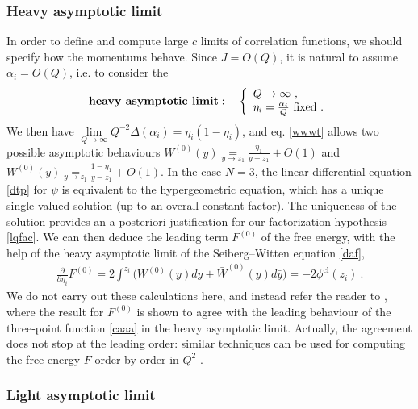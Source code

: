 \documentclass[12pt, a4paper, notitlepage, twoside]{report}
\numberwithin{equation}{section}
\theoremstyle{break}
\begin{document}
\subsubsection{Heavy asymptotic limit}

In order to define and compute large $c$ limits of correlation functions, we should specify how the momentums behave.
Since $J=O(Q)$, it is natural to assume $\alpha_i=O(Q)$, i.e. to consider the 
\begin{align}
 \textbf{\boldmath heavy\ asymptotic\ limit}\index{heavy\ asymptotic\ limit}: \quad \left\{\begin{array}{l}  Q \to \infty \ ,\\ \eta_i=\frac{\alpha_i}{Q}\ \text{fixed}\ .\end{array}\right.  
\end{align}
We then have $\underset{Q\to\infty}{\lim} Q^{-2}\Delta(\alpha_i)=\eta_i(1-\eta_i)$, and eq. \eqref{wwwt} allows two possible asymptotic behaviours $W^{(0)}(y)\underset{y\to z_1}{=} \frac{\eta_1}{y-z_1} + O(1)$ and 
$W^{(0)}(y)\underset{y\to z_1}{=} \frac{1-\eta_1}{y-z_1} + O(1)$.
In the case $N=3$, the linear differential equation \eqref{dtp} for $\psi$ is equivalent to the hypergeometric equation, which has a unique single-valued solution (up to an overall constant factor).
The uniqueness of the solution provides an a posteriori justification for our factorization hypothesis \eqref{lqfac}.
We can then deduce the leading term $F^{(0)}$ of the free energy, with the help of the heavy asymptotic limit of the Seiberg--Witten equation \eqref{daf}, 
\begin{align}
 {\frac{\partial}{\partial \eta_i}} F^{(0)} = 2\int^{z_i}\Big( W^{(0)}(y)dy + \bar W^{(0)}(y)d\bar y\Big) = -2\phi^\text{cl}(z_i)\ .
\end{align}
We do not carry out these calculations here, and instead refer the reader to \cite{zz95}, where the result for $F^{(0)}$ is shown to agree with the leading behaviour of the three-point function \eqref{caaa} in the heavy asymptotic limit.
Actually, the agreement does not stop at the leading order: similar techniques can be used for computing the free energy $F$ order by order in $Q^2$ \cite{cer12}.

\subsubsection{Light asymptotic limit}
\end{document}
